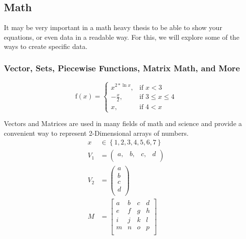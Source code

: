   \subsection{Math}
    It may be very important in a math heavy thesis to be able to show your equations, or even data in a readable way. For this, we will explore some of the ways to create specific data.
    
        \subsubsection{Vector, Sets, Piecewise Functions, Matrix Math, and More}
        
        \begin{equation}
            \text{f}(x) = 
                \begin{cases}
                    x^{2*\ln{x}},&\text{if }x<3\\
                    -\frac{x}{2},&\text{if }3\leq{}x\leq{}4\\
                    x,&\text{if }4<x
                \end{cases}
        \end{equation}
        
        Vectors and Matrices are used in many fields of math and science and provide a convenient way to represent 2-Dimensional arrays of numbers.
            \begin{align}
                x&\in{}\left\{1,2,3,4,5,6,7\right\}\\
                V_{1} &= {\left(
                \begin{array}{cccc}
                    a, & b, & c, & d\\
                \end{array}
                \right)}\\
                V_{2} &= \left(
                \begin{array}{c}
                    a \\
                    b \\
                    c \\
                    d \\
                \end{array}
                \right)\\
                M &= {\left[
                \begin{array}{cccc}
                    a & b & c & d\\
                    e & f & g & h\\
                    i & j & k & l\\
                    m & n & o & p\\
                \end{array}
                \right]}
            \end{align}

  \printreferences %
